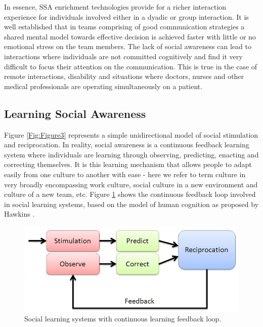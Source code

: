 \documentclass[oneside,11pt]{memoir}
\begin{document}
In essence, SSA enrichment technologies provide for a richer interaction experience for individuals involved either in a dyadic or group interaction. It is well established that in teams comprising of good communication strategies a shared mental model towards effective decision is achieved faster with little or no emotional stress on the team members. The lack of social awareness can lead to interactions where individuals are not committed cognitively and find it very difficult to focus their attention on the communication. This is true in the case of remote interactions, disability and situations where doctors, nurses and other medical professionals are operating simultaneously on a patient.

\subsection{Learning Social Awareness}
Figure \ref{Fig:Figure3} represents a simple unidirectional model of social stimulation and reciprocation. In reality, social awareness is a continuous feedback learning system where individuals are learning through observing, predicting, enacting and correcting themselves. It is this learning mechanism that allows people to adapt easily from one culture to another with ease - here we refer to term culture in very broadly encompassing work culture, social culture in a new environment and culture of a new team, etc. Figure \ref{Fig:Figure4} shows the continuous feedback loop involved in social learning systems, based on the model of human cognition as proposed by Hawkins \cite{hawkins_intelligence_2004}.

\begin{figure}[h]
\begin{center}
 \includegraphics[width=4.5in]{SSALearning.jpg} 
\caption{Social learning systems with continuous learning feedback loop.}
\label{Fig:Figure4}
\end{center}
\end{figure}
\end{document}

